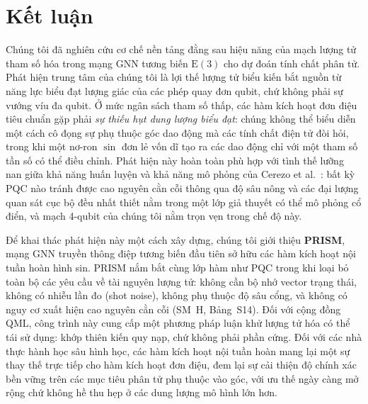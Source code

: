 \documentclass[10pt,twocolumn,letterpaper]{article}
\begin{document}
\section{Kết luận}
\label{sec:conclusion}

Chúng tôi đã nghiên cứu cơ chế nền tảng đằng sau hiệu năng của mạch lượng tử tham số hóa trong mạng GNN tương biến $\mathrm{E}(3)$ cho dự đoán tính chất phân tử. Phát hiện trung tâm của chúng tôi là lợi thế lượng tử biểu kiến bắt nguồn từ năng lực biểu đạt lượng giác của các phép quay đơn qubit, chứ không phải sự vướng víu đa qubit. Ở mức ngân sách tham số thấp, các hàm kích hoạt đơn điệu tiêu chuẩn gặp phải \textit{sự thiếu hụt dung lượng biểu đạt}: chúng không thể biểu diễn một cách cô đọng sự phụ thuộc góc dao động mà các tính chất điện tử đòi hỏi, trong khi một nơ-ron $\sin$ đơn lẻ vốn dĩ tạo ra các dao động chỉ với một tham số tần số có thể điều chỉnh. Phát hiện này hoàn toàn phù hợp với tình thế lưỡng nan giữa khả năng huấn luyện và khả năng mô phỏng của Cerezo et al.~\cite{Cerezo:2023nqf}: bất kỳ PQC nào tránh được cao nguyên cằn cỗi thông qua độ sâu nông và các đại lượng quan sát cục bộ đều nhất thiết nằm trong một lớp giả thuyết có thể mô phỏng cổ điển, và mạch 4-qubit của chúng tôi nằm trọn vẹn trong chế độ này.

Để khai thác phát hiện này một cách xây dựng, chúng tôi giới thiệu \textbf{PRISM}, mạng GNN truyền thông điệp tương biến đầu tiên sở hữu các hàm kích hoạt nội tuần hoàn hình sin. PRISM nắm bắt cùng lớp hàm như PQC trong khi loại bỏ toàn bộ các yêu cầu về tài nguyên lượng tử: không cần bộ nhớ vector trạng thái, không có nhiễu lần đo (shot noise), không phụ thuộc độ sâu cổng, và không có nguy cơ xuất hiện cao nguyên cằn cỗi (SM~H, Bảng~S14). Đối với cộng đồng QML, công trình này cung cấp một phương pháp luận khử lượng tử hóa có thể tái sử dụng: khớp thiên kiến quy nạp, chứ không phải phần cứng. Đối với các nhà thực hành học sâu hình học, các hàm kích hoạt nội tuần hoàn mang lại một sự thay thế trực tiếp cho hàm kích hoạt đơn điệu, đem lại sự cải thiện độ chính xác bền vững trên các mục tiêu phân tử phụ thuộc vào góc, với ưu thế ngày càng mở rộng chứ không hề thu hẹp ở các dung lượng mô hình lớn hơn.
\end{document}
